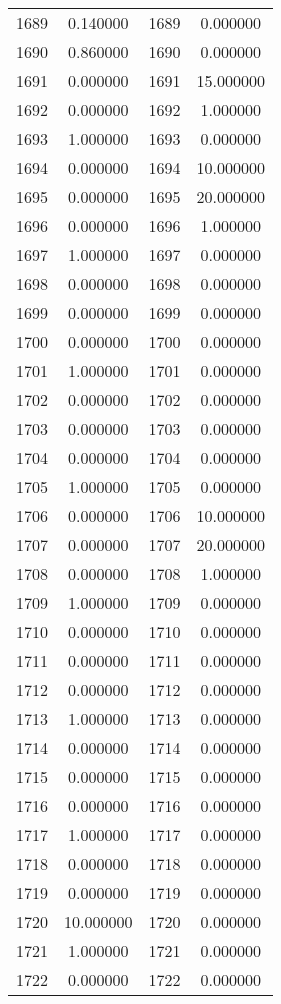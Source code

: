 \documentclass[12pt]{article}
\begin{document}
\begin{longtable}{@{}cccc@{}}
1689 & 0.140000 & 1689 & 0.000000 \\
1690 & 0.860000 & 1690 & 0.000000 \\
1691 & 0.000000 & 1691 & 15.000000 \\
1692 & 0.000000 & 1692 & 1.000000 \\
1693 & 1.000000 & 1693 & 0.000000 \\
1694 & 0.000000 & 1694 & 10.000000 \\
1695 & 0.000000 & 1695 & 20.000000 \\
1696 & 0.000000 & 1696 & 1.000000 \\
1697 & 1.000000 & 1697 & 0.000000 \\
1698 & 0.000000 & 1698 & 0.000000 \\
1699 & 0.000000 & 1699 & 0.000000 \\
1700 & 0.000000 & 1700 & 0.000000 \\
1701 & 1.000000 & 1701 & 0.000000 \\
1702 & 0.000000 & 1702 & 0.000000 \\
1703 & 0.000000 & 1703 & 0.000000 \\
1704 & 0.000000 & 1704 & 0.000000 \\
1705 & 1.000000 & 1705 & 0.000000 \\
1706 & 0.000000 & 1706 & 10.000000 \\
1707 & 0.000000 & 1707 & 20.000000 \\
1708 & 0.000000 & 1708 & 1.000000 \\
1709 & 1.000000 & 1709 & 0.000000 \\
1710 & 0.000000 & 1710 & 0.000000 \\
1711 & 0.000000 & 1711 & 0.000000 \\
1712 & 0.000000 & 1712 & 0.000000 \\
1713 & 1.000000 & 1713 & 0.000000 \\
1714 & 0.000000 & 1714 & 0.000000 \\
1715 & 0.000000 & 1715 & 0.000000 \\
1716 & 0.000000 & 1716 & 0.000000 \\
1717 & 1.000000 & 1717 & 0.000000 \\
1718 & 0.000000 & 1718 & 0.000000 \\
1719 & 0.000000 & 1719 & 0.000000 \\
1720 & 10.000000 & 1720 & 0.000000 \\
1721 & 1.000000 & 1721 & 0.000000 \\
1722 & 0.000000 & 1722 & 0.000000 \\

\end{longtable}
\end{document}
